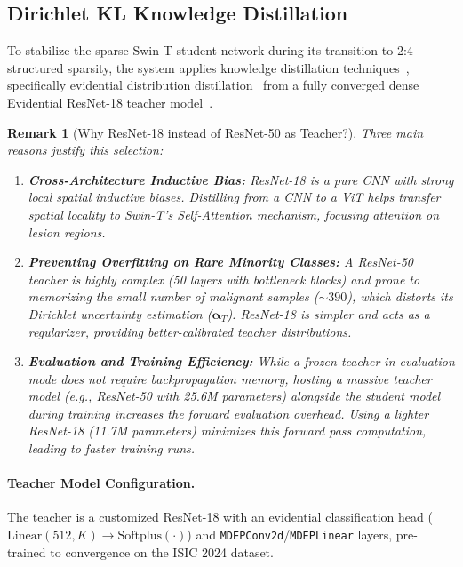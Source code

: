 \documentclass[letterpaper]{article} %
\newcommand{\softplus}{\text{Softplus}}
\newtheorem{remark}{Remark}
\begin{document}
\subsection{Dirichlet KL Knowledge Distillation}\label{subsec:distillation}

To stabilize the sparse Swin-T student network during its transition to 2:4 structured sparsity, the system applies knowledge distillation techniques~\cite{hinton2015distilling, gou2021knowledge}, specifically evidential distribution distillation~\cite{malinin2019ensemble} from a fully converged dense Evidential ResNet-18 teacher model~\cite{he2016deep}.

\begin{remark}[Why ResNet-18 instead of ResNet-50 as Teacher?]
Three main reasons justify this selection:
\begin{enumerate}[label=(\roman*)]
    \item \textbf{Cross-Architecture Inductive Bias:} ResNet-18 is a pure CNN with strong local spatial inductive biases. Distilling from a CNN to a ViT helps transfer spatial locality to Swin-T's Self-Attention mechanism, focusing attention on lesion regions.
    \item \textbf{Preventing Overfitting on Rare Minority Classes:} A ResNet-50 teacher is highly complex (50 layers with bottleneck blocks) and prone to memorizing the small number of malignant samples (${\sim}390$), which distorts its Dirichlet uncertainty estimation ($\bm{\alpha}_T$). ResNet-18 is simpler and acts as a regularizer, providing better-calibrated teacher distributions.
    \item \textbf{Evaluation and Training Efficiency:} While a frozen teacher in evaluation mode does not require backpropagation memory, hosting a massive teacher model (e.g., ResNet-50 with 25.6M parameters) alongside the student model during training increases the forward evaluation overhead. Using a lighter ResNet-18 (11.7M parameters) minimizes this forward pass computation, leading to faster training runs.
\end{enumerate}
\end{remark}

\paragraph{Teacher Model Configuration.}
The teacher is a customized ResNet-18 with an evidential classification head ($\text{Linear}(512, K) \to \softplus(\cdot)$) and \texttt{MDEPConv2d}/\texttt{MDEPLinear} layers, pre-trained to convergence on the ISIC 2024 dataset.
\end{document}
